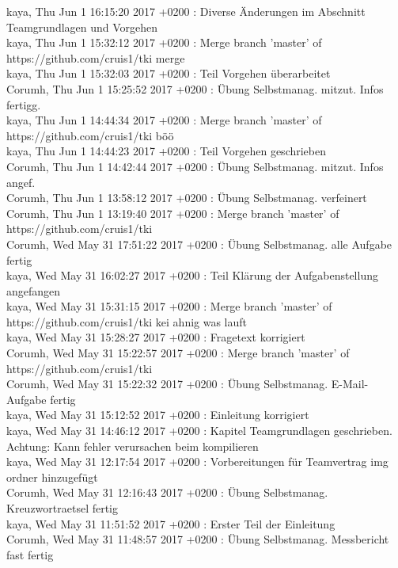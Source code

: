 kaya, Thu Jun 1 16:15:20 2017 +0200 : Diverse Änderungen im Abschnitt Teamgrundlagen und Vorgehen \\
kaya, Thu Jun 1 15:32:12 2017 +0200 : Merge branch 'master' of https://github.com/cruis1/tki merge \\
kaya, Thu Jun 1 15:32:03 2017 +0200 : Teil Vorgehen überarbeitet \\
Corumh, Thu Jun 1 15:25:52 2017 +0200 : Übung Selbstmanag. mitzut. Infos fertigg. \\
kaya, Thu Jun 1 14:44:34 2017 +0200 : Merge branch 'master' of https://github.com/cruis1/tki böö \\
kaya, Thu Jun 1 14:44:23 2017 +0200 : Teil Vorgehen geschrieben \\
Corumh, Thu Jun 1 14:42:44 2017 +0200 : Übung Selbstmanag. mitzut. Infos angef. \\
Corumh, Thu Jun 1 13:58:12 2017 +0200 : Übung Selbstmanag. verfeinert \\
Corumh, Thu Jun 1 13:19:40 2017 +0200 : Merge branch 'master' of https://github.com/cruis1/tki \\
Corumh, Wed May 31 17:51:22 2017 +0200 : Übung Selbstmanag. alle Aufgabe fertig \\
kaya, Wed May 31 16:02:27 2017 +0200 : Teil Klärung der Aufgabenstellung angefangen \\
kaya, Wed May 31 15:31:15 2017 +0200 : Merge branch 'master' of https://github.com/cruis1/tki kei ahnig was lauft \\
kaya, Wed May 31 15:28:27 2017 +0200 : Fragetext korrigiert \\
Corumh, Wed May 31 15:22:57 2017 +0200 : Merge branch 'master' of https://github.com/cruis1/tki \\
Corumh, Wed May 31 15:22:32 2017 +0200 : Übung Selbstmanag. E-Mail-Aufgabe fertig \\
kaya, Wed May 31 15:12:52 2017 +0200 : Einleitung korrigiert \\
kaya, Wed May 31 14:46:12 2017 +0200 : Kapitel Teamgrundlagen geschrieben. Achtung: Kann fehler verursachen beim kompilieren \\
kaya, Wed May 31 12:17:54 2017 +0200 : Vorbereitungen für Teamvertrag img ordner hinzugefügt \\
Corumh, Wed May 31 12:16:43 2017 +0200 : Übung Selbstmanag. Kreuzwortraetsel fertig \\
kaya, Wed May 31 11:51:52 2017 +0200 : Erster Teil der Einleitung \\
Corumh, Wed May 31 11:48:57 2017 +0200 : Übung Selbstmanag. Messbericht fast fertig \\
